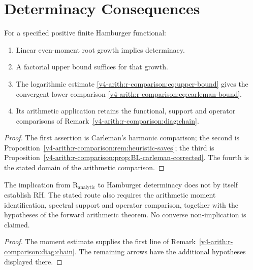 \section{Determinacy Consequences}
\label{v4-arith:r-comparison:conclusion}
\begin{theorem}
\label{v4-arith:r-comparison:thm:conclusion}
For a specified positive finite Hamburger functional:
\begin{enumerate}
\item Linear even-moment root growth implies determinacy.
\item A factorial upper bound suffices for that growth.
\item The logarithmic estimate \eqref{v4-arith:r-comparison:eq:upper-bound} gives the
convergent lower comparison \eqref{v4-arith:r-comparison:eq:carleman-bound}.
\item Its arithmetic application retains the functional, support
and operator comparisons of Remark~\ref{v4-arith:r-comparison:diag:chain}.
\end{enumerate}
\end{theorem}
\begin{proof}
The first assertion is Carleman's harmonic comparison; the second
is Proposition~\ref{v4-arith:r-comparison:rem:heuristic-saves}; the third is
Proposition~\ref{v4-arith:r-comparison:prop:BL-carleman-corrected}. The fourth is the
stated domain of the arithmetic comparison.
\end{proof}
\begin{corollary}
\label{v4-arith:r-comparison:cor:hypothesis-also-wrong}
The implication from \(\mathrm R_{\mathrm{analytic}}\) to
Hamburger determinacy does not by itself establish RH. The stated
route also requires the arithmetic moment identification, spectral
support and operator comparison, together with the hypotheses of
the forward arithmetic theorem. No converse non-implication is
claimed.
\end{corollary}
\begin{proof}
The moment estimate supplies the first line of
Remark~\ref{v4-arith:r-comparison:diag:chain}. The remaining arrows
have the additional hypotheses displayed there.
\end{proof}


